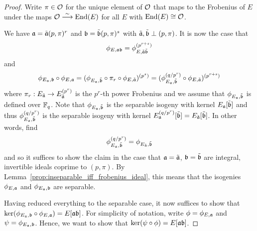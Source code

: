 \begin{proof}
    Write $\pi \in \mathcal{O}$ for the unique element of $\mathcal{O}$ that maps to the Frobenius of $E$ under the maps $\mathcal{O} \overset{\sim}{\longrightarrow} \mathrm{End}(E)$ for all $E$ with $\mathrm{End}(E) \cong \mathcal{O}$.
    
    We have $\mathfrak{a} = \tilde{\mathfrak{a}} (p, \pi)^r$ and $\mathfrak{b} = \tilde{\mathfrak{b}} (p, \pi)^s$ with $\tilde{\mathfrak{a}}, \tilde{\mathfrak{b}} \perp (p, \pi)$.
    It is now the case that
    \begin{equation*}
        \phi_{E, \mathfrak{a}\mathfrak{b}} = \phi_{E, \tilde{\mathfrak{a}} \tilde{\mathfrak{b}}}^{(p^{r + s})}
    \end{equation*}
    and
    \begin{equation*}
        \phi_{E_{\mathfrak{a}}, \mathfrak{b}} \circ \phi_{E, \mathfrak{a}} = (\phi_{E_{\mathfrak{a}}, \tilde{\mathfrak{b}}} \circ \pi_r \circ \phi_{E, \tilde{\mathfrak{a}}})^{(p^s)} = (\phi_{E_{\mathfrak{a}}, \tilde{\mathfrak{b}}}^{(q/p^r)} \circ \phi_{E, \tilde{\mathfrak{a}}})^{(p^{r + s})}
    \end{equation*}
    where $\pi_r: E_{\tilde{\mathfrak{a}}} \to E_{\tilde{\mathfrak{a}}}^{(p^r)}$ is the $p^r$-th power Frobenius and we assume that $\phi_{E_{\mathfrak{a}}, \tilde{\mathfrak{b}}}$ is defined over $\mathbb{F}_q$.
    Note that $\phi_{E_{\mathfrak{a}}, \tilde{\mathfrak{b}}}$ is the separable isogeny with kernel $E_{\mathfrak{a}}[\tilde{\mathfrak{b}}]$ and thus $\phi_{E_{\mathfrak{a}}, \tilde{\mathfrak{b}}}^{(q/p^r)}$ is the separable isogeny with kernel $E_{\mathfrak{a}}^{(q/p^r)}[\tilde{\mathfrak{b}}] = E_{\tilde{\mathfrak{a}}}[\tilde{\mathfrak{b}}]$.
    In other words, find
    \begin{equation*}
        \phi_{E_{\mathfrak{a}}, \tilde{\mathfrak{b}}}^{(q/p^r)} = \phi_{E_{\tilde{\mathfrak{a}}}, \tilde{\mathfrak{b}}}
    \end{equation*}
    and so it suffices to show the claim in the case that $\mathfrak{a} = \tilde{\mathfrak{a}}$, $\mathfrak{b} = \tilde{\mathfrak{b}}$ are integral, invertible ideals coprime to $(p, \pi)$.
    By Lemma~\ref{prop:inseparable_iff_frobenius_ideal}, this means that the isogenies $\phi_{E, \mathfrak{a}}$ and $\phi_{E_{\mathfrak{a}}, \mathfrak{b}}$ are separable.

    Having reduced everything to the separable case, it now suffices to show that $\ker(\phi_{E_{\mathfrak{a}}, \mathfrak{b}} \circ \phi_{E, \mathfrak{a}}) = E[\mathfrak{a}\mathfrak{b}]$.
    For simplicity of notation, write $\phi = \phi_{E, \mathfrak{a}}$ and $\psi = \phi_{E_{\mathfrak{a}}, \mathfrak{b}}$.
    Hence, we want to show that $\ker(\psi \circ \phi) = E[\mathfrak{a}\mathfrak{b}]$.


\end{proof}

